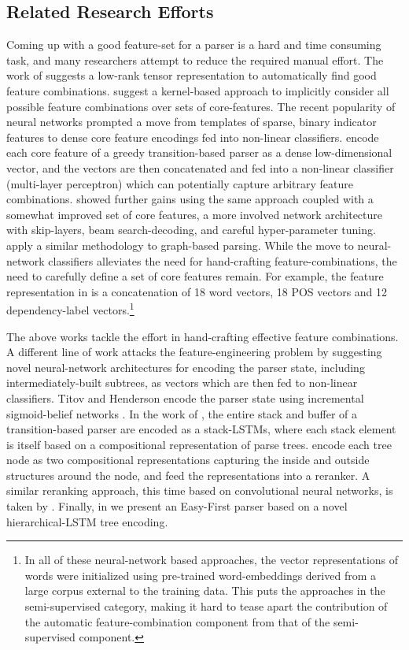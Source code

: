 \documentclass[11pt]{article}
\begin{document}
\subsection{Related Research Efforts}
\label{sec:related}
Coming up with a good feature-set for a parser is a hard and time consuming
task, and many researchers attempt to reduce the required manual effort.
The work of  suggests a low-rank tensor
representation to automatically find good feature combinations.
 suggest a kernel-based approach to
implicitly consider all possible feature combinations over sets of
core-features.  The recent popularity of neural networks prompted a move from
templates of sparse, binary indicator features to dense core feature encodings fed into non-linear
classifiers.  encode each core feature
of a greedy transition-based parser as a dense low-dimensional vector, and the vectors are then concatenated
and fed into a non-linear classifier (multi-layer perceptron) which can
potentially capture arbitrary feature combinations.   showed further gains using the same approach
coupled with a somewhat improved set of core features, a more involved network
architecture with skip-layers, beam search-decoding, and careful hyper-parameter
tuning.   apply a similar methodology to
graph-based parsing.
While the move to neural-network classifiers alleviates the need for
hand-crafting feature-combinations, the need to carefully define a set of core
features remain. For example, the feature representation  in 
is a concatenation of 18 word vectors, 18 POS vectors and 12 dependency-label
vectors.\footnote{In all of these neural-network based approaches, the vector representations of
words were initialized using pre-trained word-embeddings derived from a large
corpus external to the training data.  This puts the approaches in the
semi-supervised category, making it hard to tease apart the contribution of the
automatic feature-combination component from that of the semi-supervised
component.}

The above works tackle the effort in hand-crafting effective
feature combinations.
A different line of work attacks the feature-engineering problem by suggesting novel
neural-network architectures for encoding the parser state, including
intermediately-built subtrees, as vectors which are then fed to non-linear
classifiers.  
Titov and Henderson encode the parser state using incremental sigmoid-belief
networks .
In the work of , the entire stack and buffer of a
transition-based parser are encoded as a stack-LSTMs, where each stack element
is itself based on a compositional representation of parse trees.   encode each tree node as two compositional representations capturing the
inside and outside structures around the node, and feed the representations into
a reranker.  A similar reranking approach, this time based on convolutional
neural networks, is taken by
.
Finally, in  we 
present an Easy-First parser based on a novel hierarchical-LSTM tree encoding.
\end{document}
